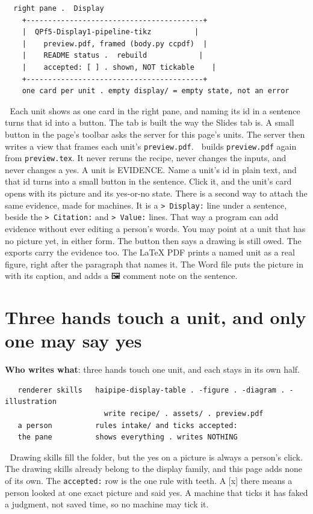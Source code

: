 \begin{verbatim}
  right pane .  Display
    +-----------------------------------------+
    |  QPf5-Display1-pipeline-tikz          |
    |    preview.pdf, framed (body.py ccpdf)  |
    |    README status .  rebuild            |
    |    accepted: [ ] . shown, NOT tickable    |
    +-----------------------------------------+
    one card per unit . empty display/ = empty state, not an error
\end{verbatim}
📌 Each unit shows as one card in the right pane, and naming its id in a sentence turns that id into a button. The tab is built the way the Slides tab is. A small button in the page's toolbar asks the server for this page's units. The server then writes a view that frames each unit's \texttt{preview.pdf}. 🔄 builds \texttt{preview.pdf} again from \texttt{preview.tex}. It never reruns the recipe, never changes the inputs, and never changes a yes. A unit is EVIDENCE. Name a unit's id in plain text, and that id turns into a small button in the sentence. Click it, and the unit's card opens with its picture and its yes-or-no state. There is a second way to attach the same evidence, made for machines. It is a \texttt{> Display:} line under a sentence, beside the \texttt{> Citation:} and \texttt{> Value:} lines. That way a program can add evidence without ever editing a person's words. You may point at a unit that has no picture yet, in either form. The button then says a drawing is still owed. The exports carry the evidence too. The LaTeX PDF prints a named unit as a real figure, right after the paragraph that names it. The Word file puts the picture in with its caption, and adds a 🖼 comment note on the sentence.


\section{Three hands touch a unit, and only one may say yes}
\textbf{Who writes what}: three hands touch one unit, and each stays in its own half.

\begin{verbatim}
   renderer skills   haipipe-display-table . -figure . -diagram . -illustration
                       write recipe/ . assets/ . preview.pdf
   a person          rules intake/ and ticks accepted:
   the pane          shows everything . writes NOTHING
\end{verbatim}
📌 Drawing skills fill the folder, but the yes on a picture is always a person's click. The drawing skills already belong to the display family, and this page adds none of its own. The \texttt{accepted:} row is the one rule with teeth. A [x] there means a person looked at one exact picture and said yes. A machine that ticks it has faked a judgment, not saved time, so no machine may tick it.

